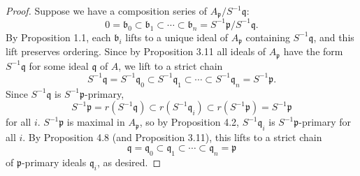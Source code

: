 \begin{proof}
Suppose we have a composition series of $A_{\mathfrak{p}}/S^{-1}\mathfrak{q}$:
$$0 = \mathfrak{b}_0 \subset \mathfrak{b}_1 \subset \cdots \subset \mathfrak{b}_n = S^{-1}\mathfrak{p}/S^{-1}\mathfrak{q}.$$
By Proposition 1.1, each $\mathfrak{b}_i$ lifts to a unique ideal of $A_{\mathfrak{p}}$ containing $S^{-1}\mathfrak{q}$, and this lift preserves ordering. Since by Proposition 3.11
all ideals of $A_{\mathfrak{p}}$ have the form $S^{-1}\mathfrak{q}$ for some ideal $\mathfrak{q}$ of $A$, we lift to a strict chain
$$S^{-1}\mathfrak{q} = S^{-1}\mathfrak{q}_0 \subset S^{-1}\mathfrak{q}_1 \subset \cdots \subset S^{-1}\mathfrak{q}_n = S^{-1}\mathfrak{p}.$$
Since $S^{-1}\mathfrak{q}$ is $S^{-1}\mathfrak{p}$-primary, 
$$S^{-1}\mathfrak{p} = r(S^{-1}\mathfrak{q}) \subset r(S^{-1}\mathfrak{q}_i) \subset r(S^{-1}\mathfrak{p}) = S^{-1}\mathfrak{p}$$
for all $i$. $S^{-1}\mathfrak{p}$ is maximal in $A_{\mathfrak{p}}$, so by Proposition 4.2, $S^{-1}\mathfrak{q}_i$ is $S^{-1}\mathfrak{p}$-primary for all $i$.
By Proposition 4.8 (and Proposition 3.11), this lifts to a strict chain
$$\mathfrak{q} = \mathfrak{q}_0 \subset \mathfrak{q}_1 \subset \cdots \subset \mathfrak{q}_n = \mathfrak{p}$$
of $\mathfrak{p}$-primary ideals $\mathfrak{q}_i$, as desired.
\end{proof}
